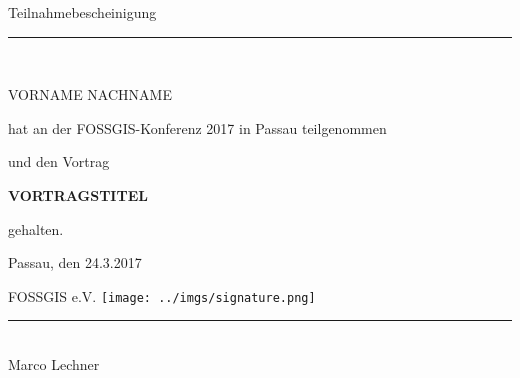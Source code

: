 \documentclass[a4paper, 12pt]{letter}
\begin{document}
  \begin{center}

    \vspace*{4mm}
    \Huge Teilnahmebescheinigung
    \noindent\rule{0.9\textwidth}{1pt}\\
    
    \vspace*{14mm}
        
    \Huge
    VORNAME NACHNAME
    
    \vspace*{8mm}
    
    \large
    
    hat an der FOSSGIS-Konferenz 2017 in Passau teilgenommen\\
    
    \vspace*{5mm}
    
    und den Vortrag\\
    
    \vspace*{5mm}
    
    {\bf VORTRAGSTITEL}\\
    
    \vspace*{5mm}
    
    gehalten.
    
    \vspace*{5mm}
    
  \end{center}


  \vspace*{5mm}

  \large
  \hskip 1cm Passau, den 24.3.2017
  
  \vspace*{10mm}
  
  \hskip 1cm FOSSGIS e.V. \hskip 1cm \texttt{[image: ../imgs/signature.png]} \hskip -6cm  \rule{7cm}{0.5pt}\\
  
  \normalsize
  \vskip -10mm \hskip 55mm Marco Lechner
\end{document}
